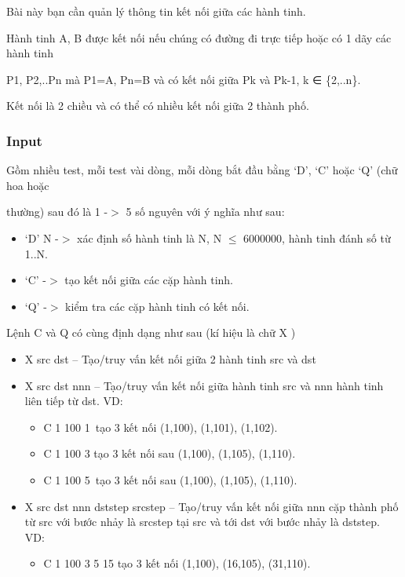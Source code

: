 

Bài này bạn cần quản lý thông tin kết nối giữa các hành tinh.

Hành tinh A, B được kết nối nếu chúng có đường đi trực tiếp hoặc có 1 dãy các hành tinh

P1, P2,..Pn mà P1=A, Pn=B và có kết nối giữa Pk và Pk-1, k ∈ \{2,..n\}.

Kết nối là 2 chiều và có thể có nhiều kết nối giữa 2 thành phố.

\subsubsection{Input}

Gồm nhiều test, mỗi test vài dòng, mỗi dòng bắt đầu bằng ‘D’, ‘C’ hoặc ‘Q’ (chữ hoa hoặc

thường) sau đó là 1 -$>$ 5 số nguyên với ý nghĩa như sau:
\begin{itemize}
	\item ‘D’ N -$>$ xác định số hành tinh là N, N $\le$ 6000000, hành tinh đánh số từ 1..N.
	\item ‘C’ -$>$ tạo kết nối giữa các cặp hành tinh.
	\item ‘Q’ -$>$ kiểm tra các cặp hành tinh có kết nối.
\end{itemize}

Lệnh C và Q có cùng định dạng như sau (kí hiệu là chữ X )
\begin{itemize}
	\item X src dst – Tạo/truy vấn kết nối giữa 2 hành tinh src và dst
	\item X src dst nnn – Tạo/truy vấn kết nối giữa hành tinh src và nnn hành tinh liên tiếp từ dst. VD:
\begin{itemize}
	\item C 1 100 1 tạo 3 kết nối (1,100), (1,101), (1,102).
	\item C 1 100 3 tạo 3 kết nối sau (1,100), (1,105), (1,110).
	\item C 1 100 5 tạo 3 kết nối sau (1,100), (1,105), (1,110).
\end{itemize}
	\item X src dst nnn dststep srcstep – Tạo/truy vấn kết nối giữa nnn cặp thành phố từ src với bước nhảy là srcstep tại src và tới dst với bước nhảy là dststep. VD:
\begin{itemize}
	\item C 1 100 3 5 15 tạo 3 kết nối (1,100), (16,105), (31,110).
\end{itemize}
\end{itemize}

